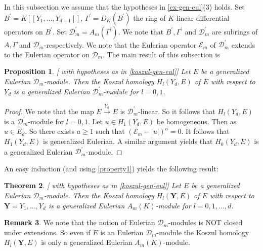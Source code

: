 \documentclass{amsart}
\newcommand{\wrt}{with respect to}
\newcommand{\D}{\mathcal{D} }
\newcommand{\E}{\mathcal{E} }
\newcommand{\bY}{\mathbf{Y} }
\theoremstyle{plain}
\newtheorem{theorem}{Theorem}[section]
\newtheorem{proposition}[theorem]{Proposition}
\theoremstyle{definition}
\newtheorem{remark}[theorem]{Remark}
\theoremstyle{remark}
\begin{document}
 \s \label{koszul-gen-eul}In this subsection we assume that the hypotheses in \ref{ex-gen-eul}(3) holds.
 Set $B^\prime = K[[Y_1,\ldots, Y_{d-1}]]$, $\Gamma^\prime = D_K(B^\prime)$ the ring of $K$-linear differential operators
 on $B^\prime$. Set $\D_m^\prime = A_m(\Gamma^\prime)$. We note that $B^\prime, \Gamma^\prime$ and $\D_m^\prime$ 
 are subrings of $A, \Gamma$ and $\D_m$-respectively. We note that the Eulerian operator $\E_m$ of $\D_m^\prime$
 extends to the Eulerian operator on $\D_m$. The main result of this subsection is
 \begin{proposition}\label{kos-induct}[ with hypotheses as in \ref{koszul-gen-eul}]
  Let $E$ be a generalized Eulerian $\D_m$-module. Then the Koszul homology $H_l(Y_d, E)$ of $E$ \wrt \ $Y_d$
  is a generalized Eulerian $\D_m^\prime$-module for $l = 0, 1$.
 \end{proposition}
\begin{proof}
 We note that the map $E \xrightarrow{Y_d} E$ is $\D_m^\prime$-linear. So it follows that $H_l(Y_d, E)$
 is a $\D_m^\prime$-module for $l = 0, 1$. Let $u \in H_1(Y_d, E)$ be homogeneous. Then as $u \in E_d$. So there exists $a \geq 1$
 such that $(\E_m - |u|)^a = 0$. It follows that  $H_1(Y_d, E)$ is generalized Eulerian. A similar argument yields
 that $H_0(Y_d, E)$ is a generalized Eulerian $\D_m^\prime$-module.
\end{proof}

 
 An easy induction  (and using \ref{property1})  yields the following result:
\begin{theorem}\label{kos-full-gen-eul}[ with hypotheses as in \ref{koszul-gen-eul}]
  Let $E$ be a generalized Eulerian $\D_m$-module. Then the Koszul homology $H_l(\bY, E)$ of $E$ \wrt \ $\bY = Y_1,\ldots, Y_d$
  is a generalized Eulerian $A_m(K)$-module for $l = 0, 1, \ldots, d$.
 \end{theorem}
 
 \begin{remark}
  We note that the notion of Eulerian $\D_m$-modules is NOT closed under extensions. So even if $E$ is an Eulerian $\D_m$-module
  the Koszul homology  $H_l(\bY, E)$ is only a generalized Eulerian $A_m(K)$-module. 
 \end{remark}

 
 
\end{document}
